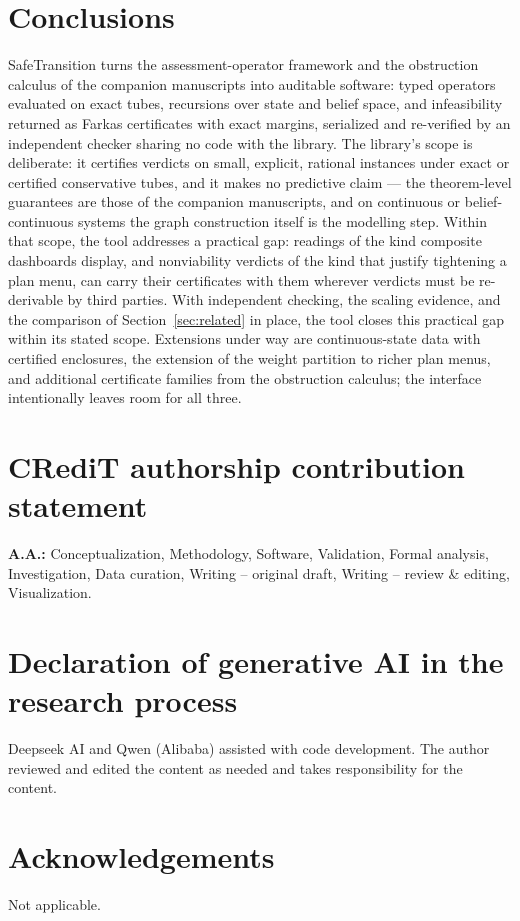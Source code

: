 \documentclass[3p,11pt]{elsarticle}
\begin{document}
\section{Conclusions}\label{sec:conclusions}

SafeTransition turns the assessment-operator framework and the obstruction
calculus of the companion manuscripts into auditable software: typed
operators evaluated on exact tubes, recursions over state and belief space,
and infeasibility returned as Farkas certificates with exact margins,
serialized and re-verified by an independent checker sharing no code with
the library. The library's scope is deliberate: it certifies verdicts on
small, explicit, rational instances under exact or certified conservative
tubes, and it makes no predictive claim --- the theorem-level guarantees
are those of the companion manuscripts, and on continuous or
belief-continuous systems the graph construction itself is the modelling
step. Within that scope, the tool addresses a practical gap: readings of
the kind composite dashboards display, and nonviability verdicts of the
kind that justify tightening a plan menu, can carry their certificates with
them wherever verdicts must be re-derivable by third parties. With
independent checking, the scaling evidence, and the comparison of
Section~\ref{sec:related} in place, the tool closes this practical gap
within its stated scope. Extensions
under way are continuous-state data with certified enclosures, the
extension of the weight partition to richer plan menus, and additional
certificate families from the obstruction calculus; the interface
intentionally leaves room for all three.

\section*{CRediT authorship contribution statement}
\textbf{A.A.:} Conceptualization, Methodology, Software, Validation,
Formal analysis, Investigation, Data curation, Writing -- original draft,
Writing -- review \& editing, Visualization.

\section*{Declaration of generative AI in the research process}
Deepseek AI and Qwen (Alibaba) assisted with code development. The author
reviewed and edited the content as needed and takes responsibility for the
content.

\section*{Acknowledgements}
Not applicable.
\end{document}
